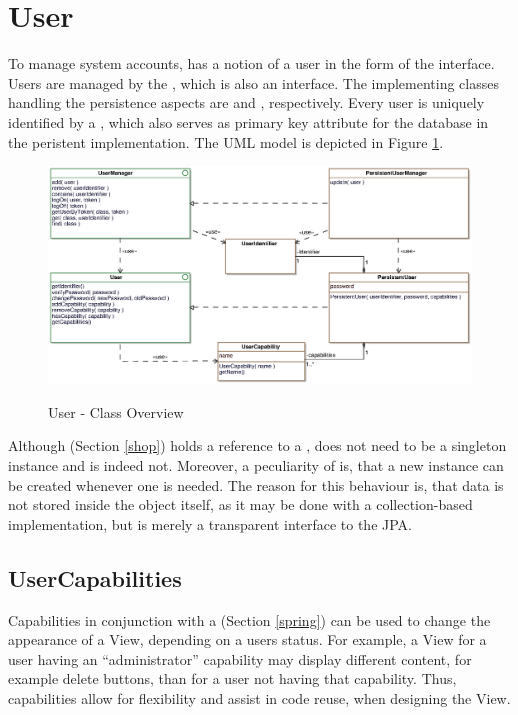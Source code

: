 \section{User}
To manage system accounts, \salespoint{} has a notion of a user in the form of the  interface.
Users are managed by the , which is also an interface.
The implementing classes handling the persistence aspects are  and , respectively.
Every user is uniquely identified by a , which also serves as primary key attribute for the database in the peristent implementation.
The UML model is depicted in Figure \ref{user_overview}.\\

\begin{figure}
	\centering
  \includegraphics[width=1.0\textwidth]{images/User_Overview.eps}
	\label{user_overview}
	\caption{User - Class Overview}
\end{figure}

Although  (Section \ref{shop}) holds a reference to a ,  does not need to be a singleton instance and is indeed not.
Moreover, a peculiarity of  is, that a new instance can be created whenever one is needed.
The reason for this behaviour is, that data is not stored inside the  object itself, as it may be done with a collection-based implementation, but  is merely a transparent interface to the JPA.\\

\subsection*{UserCapabilities}
Capabilities in conjunction with a  (Section \ref{spring}) can be used to change the appearance of a View, depending on a users status.
For example, a View for a user having an ``administrator'' capability may display different content, for example delete buttons, than for a user not having that capability.
Thus, capabilities allow for flexibility and assist in code reuse, when designing the View.

